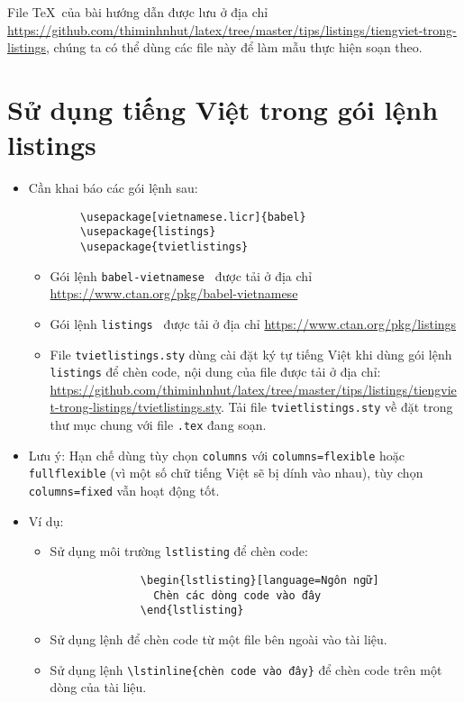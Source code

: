 \documentclass[12pt,a4paper]{article}
\begin{document}
File \TeX\ của bài hướng dẫn được lưu ở địa chỉ \url{https://github.com/thiminhnhut/latex/tree/master/tips/listings/tiengviet-trong-listings}, chúng ta có thể dùng các file này để làm mẫu thực hiện soạn theo.

\section{Sử dụng tiếng Việt trong gói lệnh listings}
\begin{itemize}
  \item Cần khai báo các gói lệnh sau:
        \begin{verbatim}
        \usepackage[vietnamese.licr]{babel}
        \usepackage{listings}
        \usepackage{tvietlistings}
      \end{verbatim}
        \begin{itemize}
          \item Gói lệnh \verb|babel-vietnamese|~\cite{vietnamese-ctan} được tải ở địa chỉ \url{https://www.ctan.org/pkg/babel-vietnamese}

          \item Gói lệnh \verb|listings|~\cite{listings-ctan} được tải ở địa chỉ \url{https://www.ctan.org/pkg/listings}

          \item File \verb|tvietlistings.sty| dùng cài đặt ký tự tiếng Việt khi dùng gói lệnh \verb|listings| để chèn code, nội dung của file được tải ở địa chỉ: \url{https://github.com/thiminhnhut/latex/tree/master/tips/listings/tiengviet-trong-listings/tvietlistings.sty}. Tải file \verb|tvietlistings.sty| về đặt trong thư mục chung với file \verb|.tex| đang soạn.
        \end{itemize}

  \item Lưu ý: Hạn chế dùng tùy chọn \verb|columns| với \verb|columns=flexible| hoặc \verb|fullflexible| (vì một số chữ tiếng Việt sẽ bị dính vào nhau), tùy chọn \verb|columns=fixed| vẫn hoạt động tốt.
  \item Ví dụ:
        \begin{itemize}
          \item Sử dụng môi trường \verb|lstlisting| để chèn code:
                \begin{verbatim}
              \begin{lstlisting}[language=Ngôn ngữ]
                Chèn các dòng code vào đây
              \end{lstlisting}
            \end{verbatim}
          \item Sử dụng lệnh \verb|| để chèn code từ một file bên ngoài vào tài liệu.

          \item Sử dụng lệnh \verb|\lstinline{chèn code vào đây}| để chèn code trên một dòng của tài liệu.
        \end{itemize}
\end{itemize}
\end{document}

